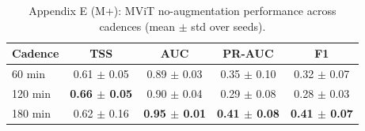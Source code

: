 \begin{table}[p]
\centering
\scriptsize
\caption{Appendix E (M+): MViT no-augmentation performance across cadences (mean $\pm$ std over seeds).}
\label{tab:appE_mplus_reordered}
\begin{tabular}{lcccc}
\toprule
Cadence & TSS & AUC & PR-AUC & F1 \\
\midrule
60 min & 0.61 $\pm$ 0.05 & 0.89 $\pm$ 0.03 & 0.35 $\pm$ 0.10 & 0.32 $\pm$ 0.07 \\
120 min & \textbf{0.66 $\pm$ 0.05} & 0.90 $\pm$ 0.04 & 0.29 $\pm$ 0.08 & 0.28 $\pm$ 0.03 \\
180 min & 0.62 $\pm$ 0.16 & \textbf{0.95 $\pm$ 0.01} & \textbf{0.41 $\pm$ 0.08} & \textbf{0.41 $\pm$ 0.07} \\
\bottomrule
\end{tabular}
\end{table}
